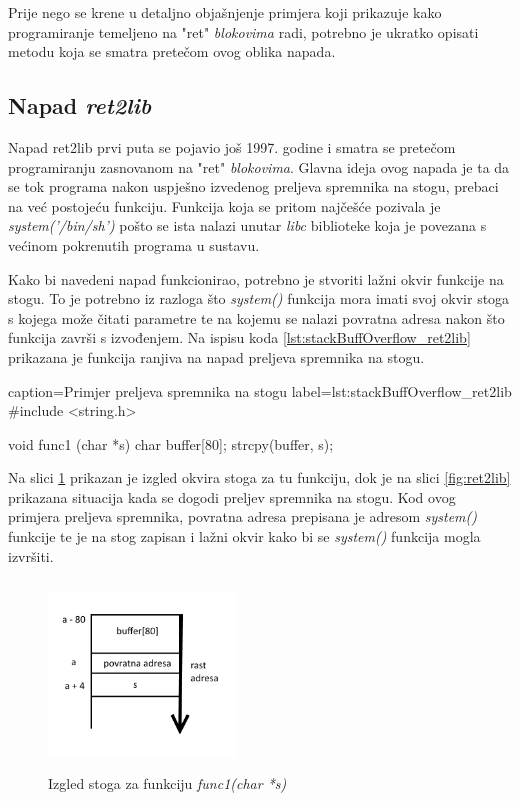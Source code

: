 \documentclass[times, utf8, diplomski, numeric]{fer}
\begin{document}
Prije nego se krene u detaljno objašnjenje primjera koji
prikazuje kako programiranje temeljeno na "ret" \emph{blokovima} radi,
potrebno je ukratko opisati metodu koja se smatra pretečom ovog
oblika napada.

\subsection{Napad \emph{ret2lib}}

Napad ret2lib prvi puta se pojavio još 1997. godine 
\citep{ret2lib_official} i smatra se pretečom programiranju
zasnovanom na "ret" \emph{blokovima}. Glavna ideja ovog napada je ta da
se tok programa nakon uspješno izvedenog preljeva spremnika na
stogu, prebaci na već postojeću funkciju. Funkcija koja se pritom
najčešće pozivala je \emph{system('/bin/sh')} pošto se ista
nalazi unutar \emph{libc} biblioteke koja je povezana s većinom
pokrenutih programa u sustavu.

Kako bi navedeni napad funkcionirao, potrebno je stvoriti lažni
okvir funkcije na stogu. To je potrebno iz razloga što
\emph{system()} funkcija mora imati svoj okvir stoga s kojega
može čitati parametre te na kojemu se nalazi povratna adresa
nakon što funkcija završi s izvođenjem. Na ispisu  koda 
\ref{lst:stackBuffOverflow_ret2lib} prikazana je funkcija ranjiva
na napad preljeva spremnika na stogu.

\begin{ispis} {caption=Primjer preljeva spremnika na stogu} {label=lst:stackBuffOverflow_ret2lib}
#include <string.h>
 
void func1 (char *s)
{
	char buffer[80];
	strcpy(buffer, s);
}

\end{ispis}

Na slici \ref{fig:ret2lib_stackFrame} prikazan je izgled okvira
stoga za tu funkciju, dok je na slici \ref{fig:ret2lib} prikazana
situacija kada se dogodi preljev spremnika na stogu. Kod ovog
primjera preljeva spremnika, povratna adresa prepisana je adresom
\emph{system()} funkcije te je na stog zapisan i lažni okvir kako
bi se \emph{system()} funkcija mogla izvršiti.  


\begin{figure}[!htb]
\centering
\setlength\fboxsep{0pt}
\setlength\fboxrule{0.5pt}
\includegraphics[width=5cm, height=5cm]{slike/ret2lib_stackFrame}
\caption{Izgled stoga za funkciju \emph{func1(char *s)}}
\label{fig:ret2lib_stackFrame} 
\end{figure}
\end{document}
